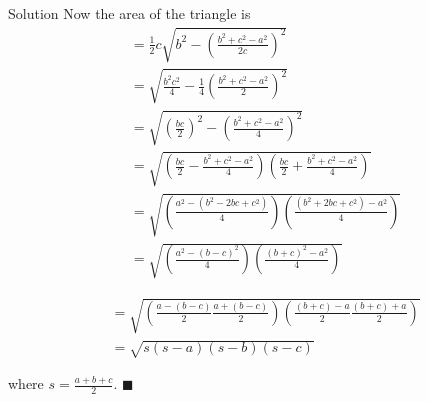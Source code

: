 \documentclass{article}
\begin{document}
\begin{solution}{Solution}
Now the area of the triangle is
\[
\begin{aligned}
&= \frac12 c \sqrt{b^2 - \left(\frac{b^2 + c^2 - a^2}{2c}\right)^2} \\
&= \sqrt{\frac{b^2c^2}{4} - \frac14\left(\frac{b^2 + c^2 - a^2}{2}\right)^2} \\
&= \sqrt{\left( \frac{bc}{2} \right)^2 - \left(\frac{b^2+c^2-a^2}{4}\right)^2} \\
&= \sqrt{\left(\frac{bc}{2} - \frac{b^2+c^2-a^2}{4}\right)
\left(\frac{bc}{2} + \frac{b^2+c^2-a^2}{4}\right)}\\
&= \sqrt{\left(\frac{a^2-(b^2 - 2bc + c^2)}{4}\right)
\left(\frac{(b^2 + 2bc + c^2) - a^2}{4}\right)}\\
&= \sqrt{\left(\frac{a^2-(b-c)^2}{4}\right)
\left(\frac{(b+c)^2 - a^2}{4}\right)}
\end{aligned}
\]

\[
\begin{aligned}
&= \sqrt{\left(\frac{a-(b-c)}{2}\frac{a+(b-c)}{2}\right)
\left(\frac{(b+c) - a}{2}\frac{(b+c)+a}{2}\right)}\\
&= \sqrt{s(s-a)(s-b)(s-c)}
\end{aligned}
\]

where $s = \frac{a+b+c}{2}$. $\blacksquare$

\end{solution}
\newpage
\end{document}
